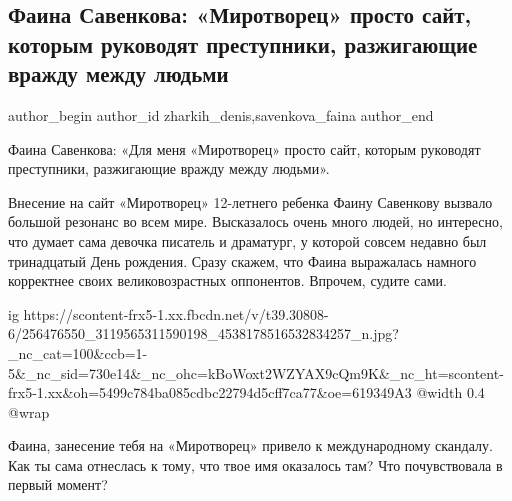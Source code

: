  
 
 
 
 
 
\subsection{Фаина Савенкова: «Миротворец» просто сайт, которым руководят преступники, разжигающие вражду между людьми}
\label{sec:10_11_2021.fb.zharkih_denis.2.savenkova_mirotvorec}
 
\ifcmt
 author_begin
   author_id zharkih_denis,savenkova_faina
 author_end
\fi

Фаина Савенкова: «Для меня «Миротворец» просто сайт, которым руководят
преступники, разжигающие вражду между людьми».

Внесение на сайт «Миротворец» 12-летнего ребенка Фаину Савенкову вызвало
большой резонанс во всем мире. Высказалось очень много людей, но интересно, что
думает сама девочка писатель и драматург, у которой совсем недавно был
тринадцатый День рождения. Сразу скажем, что Фаина выражалась намного
корректнее своих великовозрастных оппонентов. Впрочем, судите сами.  

\ifcmt
  ig https://scontent-frx5-1.xx.fbcdn.net/v/t39.30808-6/256476550_3119565311590198_4538178516532834257_n.jpg?_nc_cat=100&ccb=1-5&_nc_sid=730e14&_nc_ohc=kBoWoxt2WZYAX9cQm9K&_nc_ht=scontent-frx5-1.xx&oh=5499c784ba085cdbc22794d5cff7ca77&oe=619349A3
  @width 0.4
  @wrap 
\fi

Фаина, занесение тебя на «Миротворец» привело к международному скандалу. Как ты
сама отнеслась к тому, что твое имя оказалось там? Что почувствовала в первый
момент?

